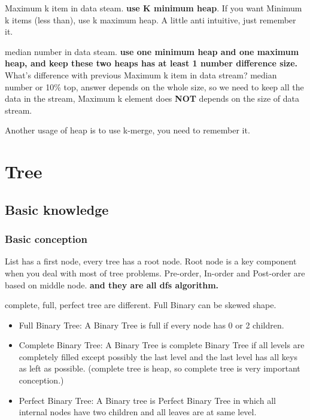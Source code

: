 \documentclass[a4paper,11pt,twoside]{book}
\begin{document}
	\par Maximum k item in data steam. \textbf{use K minimum heap}. If you want Minimum k items (less than), use k maximum heap. A little anti intuitive, just remember it.

	\par median number in data steam. \textbf{use one minimum heap and one maximum heap, and keep these two heaps has at least 1 number difference size.}  What's difference with previous Maximum k item in data stream? median number or 10\% top,  answer depends on the whole size, so we need to keep all the data in the stream,  Maximum k element does \textbf{NOT} depends on the size of data stream.

 
	\par Another usage of heap is to use k-merge, you need to remember it. 


\section{Tree}
\subsection{Basic knowledge}
\subsubsection{Basic conception}

	
	\par List has a first node, every tree has a root node. Root node is a key component when you deal with most of tree problems. Pre-order, In-order and Post-order are based on middle node. \textbf{and they are all dfs algorithm.}

	\par complete, full, perfect tree are different. Full Binary can be skewed shape. 
	
\begin{itemize}
	\item Full Binary Tree: A Binary Tree is full if every node has 0 or 2 children. 
	
	
	\item Complete Binary Tree: A Binary Tree is complete Binary Tree if all levels are completely filled except possibly the last level and the last level has all keys as left as possible. (complete tree is heap, so complete tree is very important conception.)
	
	\item Perfect Binary Tree: A Binary tree is Perfect Binary Tree in which all internal nodes have two children and all leaves are at same level.
\end{itemize}
\end{document}
